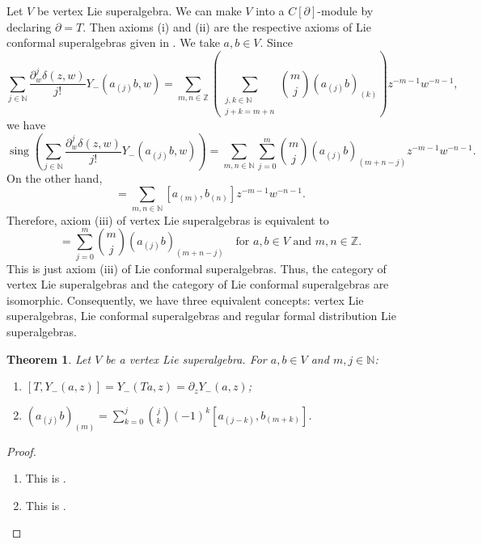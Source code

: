 \documentclass[a4paper, 12pt, reqno]{amsart}
\newtheorem{theorem}{Theorem}[section]
\theoremstyle{remark}
\DeclareMathOperator{\sing}{sing}
\begin{document}
Let $V$ be vertex Lie superalgebra.
We can make $V$ into a $C[\partial]$-module by declaring $\partial = T$.
Then axioms (i) and (ii) are the respective axioms of Lie conformal superalgebras given in .
We take $a, b \in V$.
Since
\begin{equation*}
  \sum_{j \in \mathbb{N}}\frac{\partial^j_w\delta(z, w)}{j!}Y_-(a_{(j)}b, w) = \sum_{m, n \in \mathbb{Z}}\left(\sum_{\substack{j, k \in \mathbb{N} \\ j + k = m + n}}\binom{m}{j}(a_{(j)}b)_{(k)}\right)z^{-m - 1}w^{-n - 1},
\end{equation*}
we have
\begin{equation*}
  \sing\left(\sum_{j \in \mathbb{N}}\frac{\partial^j_w\delta(z, w)}{j!}Y_-(a_{(j)}b, w)\right) = \sum_{m, n \in \mathbb{N}}\sum_{j = 0}^m\binom{m}{j}(a_{(j)}b)_{(m + n - j)}z^{-m - 1}w^{-n - 1}.
\end{equation*}
On the other hand,
\begin{equation*}
  [Y_-(a, z), Y_-(b, w)] = \sum_{m, n \in \mathbb{N}}[a_{(m)}, b_{(n)}]z^{-m - 1}w^{-n - 1}.
\end{equation*}
Therefore, axiom (iii) of vertex Lie superalgebras is equivalent to
\begin{equation*}
  [a_{(m)}, b_{(n)}] = \sum_{j = 0}^m\binom{m}{j}(a_{(j)}b)_{(m + n - j)} \quad \text{for $a, b \in V$ and $m, n \in \mathbb{Z}$}.
\end{equation*}
This is just axiom (iii) of Lie conformal superalgebras.
Thus, the category of vertex Lie superalgebras and the category of Lie conformal superalgebras are isomorphic.
Consequently, we have three equivalent concepts: vertex Lie superalgebras, Lie conformal superalgebras and regular formal distribution Lie superalgebras.

\begin{theorem}
  \label{thr:46}
  Let $V$ be a vertex Lie superalgebra.
  For $a, b \in V$ and $m, j \in \mathbb{N}$:
  \begin{enumerate}
  \item $[T, Y_-(a, z)] = Y_-(Ta, z) = \partial_zY_-(a, z)$;
  \item $(a_{(j)}b)_{(m)} = \sum_{k = 0}^j\binom{j}{k}(-1)^k[a_{(j - k)}, b_{(m + k)}]$.
  \end{enumerate}
\end{theorem}

\begin{proof}\leavevmode
  \begin{enumerate}
  \item This is .
  \item This is . \qedhere
  \end{enumerate}
\end{proof}
\end{document}
